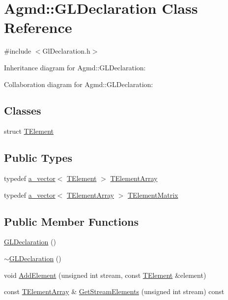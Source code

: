 \hypertarget{class_agmd_1_1_g_l_declaration}{\section{Agmd\+:\+:G\+L\+Declaration Class Reference}
\label{class_agmd_1_1_g_l_declaration}
}


{\ttfamily \#include $<$Gl\+Declaration.\+h$>$}



Inheritance diagram for Agmd\+:\+:G\+L\+Declaration\+:


Collaboration diagram for Agmd\+:\+:G\+L\+Declaration\+:
\subsection*{Classes}
\begin{DoxyCompactItemize}
\item 
struct \hyperlink{struct_agmd_1_1_g_l_declaration_1_1_t_element}{T\+Element}
\end{DoxyCompactItemize}
\subsection*{Public Types}
\begin{DoxyCompactItemize}
\item 
typedef \hyperlink{_vector_8h_a3df82cea60ff4ad0acb44e58454406a5}{a\+\_\+vector}$<$ \hyperlink{struct_agmd_1_1_g_l_declaration_1_1_t_element}{T\+Element} $>$ \hyperlink{class_agmd_1_1_g_l_declaration_ac27d21b565226320017925e6d79cf5ec}{T\+Element\+Array}
\item 
typedef \hyperlink{_vector_8h_a3df82cea60ff4ad0acb44e58454406a5}{a\+\_\+vector}$<$ \hyperlink{class_agmd_1_1_g_l_declaration_ac27d21b565226320017925e6d79cf5ec}{T\+Element\+Array} $>$ \hyperlink{class_agmd_1_1_g_l_declaration_a8efdeef74a5b78ebe90c301ba7a3331f}{T\+Element\+Matrix}
\end{DoxyCompactItemize}
\subsection*{Public Member Functions}
\begin{DoxyCompactItemize}
\item 
\hyperlink{class_agmd_1_1_g_l_declaration_a8b1a93c0763614e27e55da54d17ce7bf}{G\+L\+Declaration} ()
\item 
\hyperlink{class_agmd_1_1_g_l_declaration_a9c48ca2d745ae06a7941ff547c822d06}{$\sim$\+G\+L\+Declaration} ()
\item 
void \hyperlink{class_agmd_1_1_g_l_declaration_aa74b234c966c2af032236825059304dd}{Add\+Element} (unsigned int stream, const \hyperlink{struct_agmd_1_1_g_l_declaration_1_1_t_element}{T\+Element} \&element)
\item 
const \hyperlink{class_agmd_1_1_g_l_declaration_ac27d21b565226320017925e6d79cf5ec}{T\+Element\+Array} \& \hyperlink{class_agmd_1_1_g_l_declaration_a923e4f7ca34d2a9e8276f9b3bb5fed0a}{Get\+Stream\+Elements} (unsigned int stream) const 
\end{DoxyCompactItemize}

